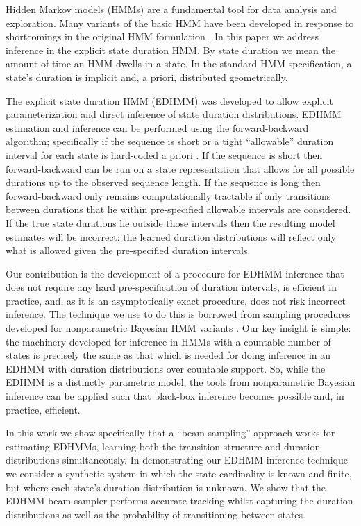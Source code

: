 \label{section}
Hidden Markov models (HMMs) are a fundamental tool for data analysis and exploration.  Many variants of the basic HMM have been developed in response to shortcomings in the original HMM formulation \cite{Rabiner89}.  In this paper we address inference in the explicit state duration HMM.  By state duration we mean the amount of time an HMM dwells in a state.  In the standard HMM specification, a state's duration is implicit and, a priori, distributed geometrically.

The explicit state duration HMM (EDHMM) \cite{Rabiner89} was developed to allow explicit parameterization and direct inference of state duration distributions.   EDHMM estimation and inference can be performed using the forward-backward algorithm; specifically if the sequence is short or a tight ``allowable'' duration interval for each state is hard-coded a priori \cite{Yu2006}.   If the sequence is short then forward-backward can be run on a state representation that allows for all possible durations up to the observed sequence length.  If the sequence is long then forward-backward only remains computationally tractable if only transitions between durations that lie within pre-specified allowable intervals are considered.   If the true state durations lie outside those intervals then the resulting model estimates will be incorrect: the learned duration distributions will reflect only what is allowed given the pre-specified duration intervals. %

Our contribution is the development of a procedure for EDHMM inference that does not require any hard pre-specification of duration intervals, is efficient in practice, and, as it is an asymptotically exact procedure, does not risk incorrect inference.  The technique we use to do this 
is borrowed from sampling procedures developed for nonparametric  Bayesian HMM variants \cite{vanGael2008}.  Our key insight is simple: the machinery developed for inference in HMMs with a countable number of states is precisely the same as that which is needed for doing inference in an EDHMM with duration distributions over countable support.  So, while the EDHMM is a distinctly parametric model, the tools from nonparametric Bayesian inference can be applied such that black-box inference becomes possible and, in practice, efficient.

In this work we show specifically that a ``beam-sampling'' approach  \cite{vanGael2008} works for  estimating EDHMMs, learning both the transition structure and duration distributions simultaneously.  In demonstrating our EDHMM inference technique we consider a synthetic system  in which the state-cardinality is known and finite, but where each state's duration distribution is unknown. We show that the EDHMM beam sampler performs accurate tracking whilst capturing the duration distributions as well as the probability of transitioning between states.

